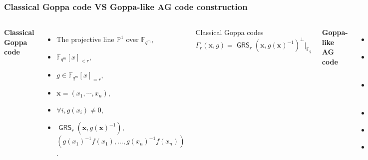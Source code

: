 \documentclass[
10pt, %
%
aspectratio=169, %
]{beamer}
\theoremstyle{plain}%
\theoremstyle{definition}
\theoremstyle{remark}
\newcommand{\calP}{\mathcal{P}}
\newcommand{\calL}{\mathcal{L}}
\newcommand{\calC}{\mathcal{C}}
\newcommand{\calX}{\mathcal{X}}
\newcommand{\fqm}{\mathbb{F}_{q^m}}
\newcommand{\fq}{\mathbb{F}_{q}}
\newcommand{\GRS}{\operatorname{\mathsf{GRS}}}
\newcommand{\degab}[1]{\deg_{a,b}\left(#1\right)}
\begin{document}
	
	\begin{frame}
		\frametitle{Classical Goppa code VS Goppa-like AG code construction }
		
		\begin{columns}[T]
		\textcolor{amaranth}{\textbf{Classical Goppa code}}
		\begin{itemize}
			\item The projective line $\mathbb{P}^1$ over $\fqm$,
			\item $\fqm[x]_{<r}$,
			\item $g \in \fqm[x]_{= r}$,
			\item $\mathbf{x}=(x_1,\cdots,x_n)$,
			\item $\forall i, g(x_i)\neq 0$,
			\item $\GRS_r(\mathbf{x}, g(\mathbf{x})^{-1})$,
			\textcolor{amaranth}{$(g(x_1)^{-1}f(x_1),\dots,g(x_n)^{-1}f(x_n)) $.}
		\end{itemize}
		\begin{block}{Classical Goppa codes}
			$$\Gamma_r(\mathbf{x},g)= \GRS_r(\mathbf{x},g(\mathbf{x})^{-1})^\perp|_{\fq}$$
		\end{block}
				\textcolor{palatinatepurple}{\textbf{Goppa-like AG code}}
			\begin{itemize}
				\item[\textcolor{palatinatepurple}{\faArrowCircleRight}] A $C_{a,b}$ curve $\calX_{a,b}$ over $\fqm$, %
				\item[\textcolor{palatinatepurple}{\faArrowCircleRight}] The v.s $\calL(s)$ of functions $f$ where $\degab{f} \leq s$, 
				\item[\textcolor{palatinatepurple}{\faArrowCircleRight}] Let $g $ such that $\degab{g}=s'$ with $s'>s$, %
				\item[\textcolor{palatinatepurple}{\faArrowCircleRight}] $\calP= \{P_1,P_2,\cdots,P_n\}$, %
				\item[\textcolor{palatinatepurple}{\faArrowCircleRight}] $\forall i$, $g(P_i)\neq 0$,
				\item[\textcolor{palatinatepurple}{\faArrowCircleRight}] $\calC=\calC(\calX_{a,b},\calP,g^{-1}\calL(s))$, %
				\textcolor{palatinatepurple}{ $\left( g^{-1}(P_1)f(P_1),\dots,g^{-1}(P_n)f(P_n) \right)$.}
			\end{itemize}
			\begin{block}{The \textbf{Goppa--like} AG code associated to $\calC$}
				$$ \Gamma(\calX_{a,b},\calP,g) := \calC^{\perp}|_{\fq}.$$
			\end{block}
			

\end{columns}
\end{frame}
\end{document}
